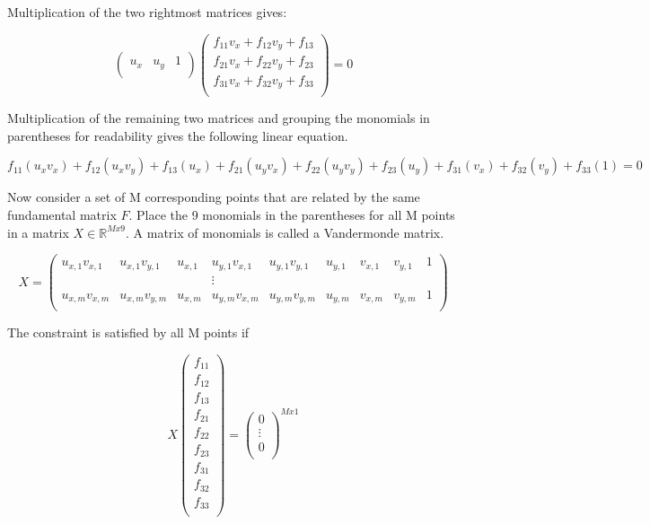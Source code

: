 Multiplication of the two rightmost matrices gives:

\[
\begin{pmatrix}
u_x & u_y & 1 \\
\end{pmatrix}
\begin{pmatrix}
f_{11} v_x + f_{12} v_y + f_{13} \\
f_{21} v_x + f_{22} v_y + f_{23} \\
f_{31} v_x + f_{32} v_y + f_{33} \\
\end{pmatrix}
= 0
\]

Multiplication of the remaining two matrices and grouping the monomials in parentheses for readability gives the following linear equation.

\[
f_{11} (u_x v_x) + f_{12} (u_x v_y) + f_{13} (u_x) +
f_{21} (u_y v_x) + f_{22} (u_y v_y) + f_{23} (u_y) +
f_{31} (v_x) + f_{32} (v_y) + f_{33} (1)
= 0
\]

Now consider a set of M corresponding points that are related by the same fundamental matrix $F$. Place the 9 monomials in the parentheses for all M points in a matrix $ X \in \mathbb{R}^{Mx9} $. A matrix of monomials is called a Vandermonde matrix.

\[
X=
\begin{pmatrix}
u_{x,1} v_{x,1} & u_{x,1} v_{y,1} & u_{x,1} & u_{y,1} v_{x,1} & u_{y,1} v_{y,1} & u_{y,1} & v_{x,1} & v_{y,1} & 1 \\
 & & & \vdots & & & & & \\
u_{x,m} v_{x,m} & u_{x,m} v_{y,m} & u_{x,m} & u_{y,m} v_{x,m} & u_{y,m} v_{y,m} & u_{y,m} & v_{x,m} & v_{y,m} & 1 \\
\end{pmatrix}
\]

The constraint is satisfied by all M points if

\[
X
\begin{pmatrix}
f_{11} \\
f_{12} \\
f_{13} \\
f_{21} \\
f_{22} \\
f_{23} \\
f_{31} \\
f_{32} \\
f_{33} \\
\end{pmatrix}
=
\begin{pmatrix}
0 \\
\vdots \\
0 \\
\end{pmatrix}
^{Mx1}
\]

